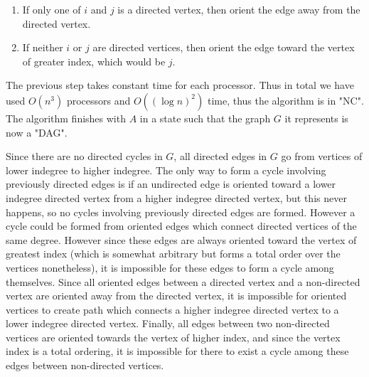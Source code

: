\documentclass{article}
\begin{document}
\begin{enumerate}
\begin{enumerate}
\begin{enumerate}
		\item If only one of $i$ and $j$ is a directed vertex, then orient the edge away from the directed vertex.
		
		\item If neither $i$ or $j$ are directed vertices, then orient the edge toward the vertex of greater index, which would be $j$.
\end{enumerate}

\par The previous step takes constant time for each processor. Thus in total we have used $O(n^3)$ processors and $O((\log n)^2)$ time, thus the algorithm is in "NC". The algorithm finishes with $A$ in a state such that the graph $G$ it represents is now a "DAG".

\par Since there are no directed cycles in $G$, all directed edges in $G$ go from vertices of lower indegree to higher indegree.  The only way to form a cycle involving previously directed edges is if an undirected edge is oriented toward a lower indegree directed vertex from a higher indegree directed vertex, but this never happens, so no cycles involving previously directed edges are formed.  However a cycle could be formed from oriented edges which connect directed vertices of the same degree. However since these edges are always oriented toward the vertex of greatest index (which is somewhat arbitrary but forms a total order over the vertices nonetheless), it is impossible for these edges to form a cycle among themselves. Since all oriented edges between a directed vertex and a non-directed vertex are oriented away from the directed vertex, it is impossible for oriented vertices to create path which connects a higher indegree directed vertex to a lower indegree directed vertex. Finally, all edges between two non-directed vertices are oriented towards the vertex of higher index, and since the vertex index is a total ordering, it is impossible for there to exist a cycle among these edges between non-directed vertices.
\end{enumerate}

\end{enumerate}
\end{document}
